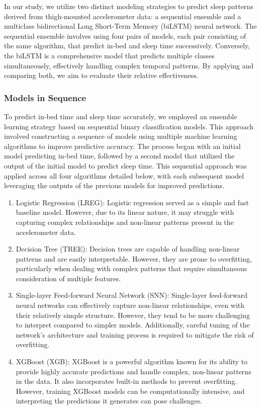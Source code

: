 \documentclass[
  super,
  preprint,
  3p]{elsarticle}
\begin{document}
In our study, we utilize two distinct modeling strategies to predict
sleep patterns derived from thigh-mounted accelerometer data: a
sequential ensemble and a multiclass bidirectional Long Short-Term
Memory (biLSTM)\citep{hochreiter1997} neural network. The sequential
ensemble involves using four pairs of models, each pair consisting of
the same algorithm, that predict in-bed and sleep time successively.
Conversely, the biLSTM is a comprehensive model that predicts multiple
classes simultaneously, effectively handling complex temporal patterns.
By applying and comparing both, we aim to evaluate their relative
effectiveness.

\hypertarget{models-in-sequence}{%
\subsubsection{Models in Sequence}\label{models-in-sequence}}

To predict in-bed time and sleep time accurately, we employed an
ensemble learning strategy based on sequential binary classification
models. This approach involved constructing a sequence of models using
multiple machine learning algorithms to improve predictive accuracy. The
process began with an initial model predicting in-bed time, followed by
a second model that utilized the output of the initial model to predict
sleep time. This sequential approach was applied across all four
algorithms detailed below, with each subsequent model leveraging the
outputs of the previous models for improved predictions.

\begin{enumerate}
\def\labelenumi{\arabic{enumi}.}
\item
  Logistic Regression (LREG): Logistic regression served as a simple and
  fast baseline model. However, due to its linear nature, it may
  struggle with capturing complex relationships and non-linear patterns
  present in the accelerometer data.
\item
  Decision Tree (TREE): Decision trees are capable of handling
  non-linear patterns and are easily interpretable. However, they are
  prone to overfitting, particularly when dealing with complex patterns
  that require simultaneous consideration of multiple features.
\item
  Single-layer Feed-forward Neural Network (SNN): Single-layer
  feed-forward neural networks can effectively capture non-linear
  relationships, even with their relatively simple structure. However,
  they tend to be more challenging to interpret compared to simpler
  models. Additionally, careful tuning of the network's architecture and
  training process is required to mitigate the risk of overfitting.
\item
  XGBoost (XGB): XGBoost is a powerful algorithm known for its ability
  to provide highly accurate predictions and handle complex, non-linear
  patterns in the data. It also incorporates built-in methods to prevent
  overfitting. However, training XGBoost models can be computationally
  intensive, and interpreting the predictions it generates can pose
  challenges.
\end{enumerate}
\end{document}
